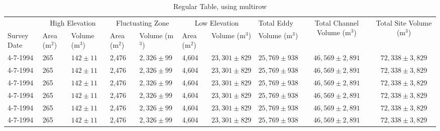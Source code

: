 \documentclass[12pt,letterpaper]{article}
\begin{document}
	
	\begin{landscape}
	\begin{table}[H]
	\caption{Regular Table, using multirow}
	\begin{tabular}{llllllllcc}
		\toprule
	 &  \multicolumn{2}{c}{High Elevation}   & \multicolumn{2}{c}{Fluctuating Zone}  &   \multicolumn{2}{c}{Low Elevation}    & {Total Eddy}        &  \multirow{2}{2.6cm}{Total Channel Volume (m$^3$) }           & \multirow{2}{2.5cm}{Total Site  Volume (m$^3$) }        \\
    \cmidrule(r){2-3} 						\cmidrule(r){4-5} 						\cmidrule(r){6-7} 
{Survey Date} & {Area (m{$^2$})} & {Volume (m{$^3$})} & {Area (m{$^2$})} & {Volume (m{$^3$})} & {Area (m{$^2$})} & {Volume (m{$^3$})}  & {Volume (m{$^3$})}  &    &

\\ \midrule
		4-7-1994                                                                & 265              & {$142   \pm  11$}  & 2,476            & {$2,326  \pm 99$}  & 4,604            & {$23,301  \pm 829$} & {$25,769  \pm 938$} & {$46,569  \pm 2,891$} & {$72,338  \pm 3,829$} \\
		4-7-1994                                                                & 265              & {$142   \pm  11$}  & 2,476            & {$2,326  \pm 99$}  & 4,604            & {$23,301  \pm 829$} & {$25,769  \pm 938$} & {$46,569  \pm 2,891$} & {$72,338  \pm 3,829$} \\
		4-7-1994                                                                & 265              & {$142   \pm  11$}  & 2,476            & {$2,326  \pm 99$}  & 4,604            & {$23,301  \pm 829$} & {$25,769  \pm 938$} & {$46,569  \pm 2,891$} & {$72,338  \pm 3,829$} \\
		4-7-1994                                                                & 265              & {$142   \pm  11$}  & 2,476            & {$2,326  \pm 99$}  & 4,604            & {$23,301  \pm 829$} & {$25,769  \pm 938$} & {$46,569  \pm 2,891$} & {$72,338  \pm 3,829$} \\
		4-7-1994                                                                & 265              & {$142   \pm  11$}  & 2,476            & {$2,326  \pm 99$}  & 4,604            & {$23,301  \pm 829$} & {$25,769  \pm 938$} & {$46,569  \pm 2,891$} & {$72,338  \pm 3,829$} \\
		4-7-1994                                                                & 265              & {$142   \pm  11$}  & 2,476            & {$2,326  \pm 99$}  & 4,604            & {$23,301  \pm 829$} & {$25,769  \pm 938$} & {$46,569  \pm 2,891$} & {$72,338  \pm 3,829$}
			\end{tabular}


\end{table}
\end{landscape}
\end{document}
